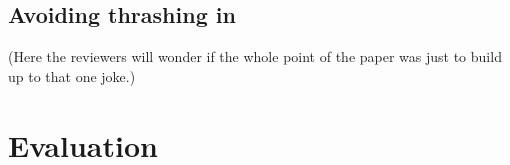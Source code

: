 \documentclass[pldi]{sigplanconf-pldi15}
\begin{document}
\subsection{Avoiding thrashing in \quicksand}

(Here the reviewers will wonder if the whole point of the paper was just to build up to that one joke.)


\section{Evaluation}

\end{document}
